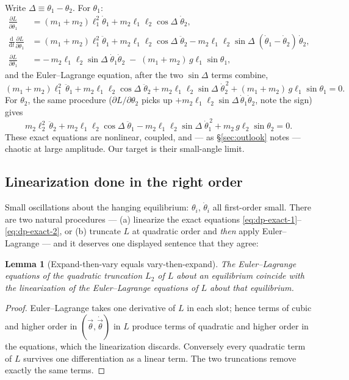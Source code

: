 \documentclass[11pt]{article}
\theoremstyle{plain}
\newtheorem{lemma}[theorem]{Lemma}
\theoremstyle{definition}
\theoremstyle{remark}
\newcommand{\dd}{\mathrm{d}}
\newcommand{\pd}[2]{\frac{\partial #1}{\partial #2}}
\newcommand{\vth}{\vec{\theta}}
\begin{document}
Write $\Delta \equiv \theta_1 - \theta_2$. For $\theta_1$:
\begin{align}
  \pd{L}{\dot\theta_1}
  &= (m_1{+}m_2)\ell_1^2\dot\theta_1
   + m_2\ell_1\ell_2\cos\Delta\;\dot\theta_2, \\
  \frac{\dd}{\dd t}\pd{L}{\dot\theta_1}
  &= (m_1{+}m_2)\ell_1^2\ddot\theta_1
   + m_2\ell_1\ell_2\cos\Delta\;\ddot\theta_2
   - m_2\ell_1\ell_2\sin\Delta\;(\dot\theta_1 - \dot\theta_2)\,\dot\theta_2, \\
  \pd{L}{\theta_1}
  &= -\,m_2\ell_1\ell_2\sin\Delta\;\dot\theta_1\dot\theta_2
   \;-\; (m_1{+}m_2)\,g\ell_1\sin\theta_1 ,
\end{align}
and the Euler--Lagrange equation, after the two $\sin\Delta$ terms
combine,
\begin{equation}
  (m_1{+}m_2)\ell_1^2\,\ddot\theta_1
  + m_2\ell_1\ell_2\cos\Delta\;\ddot\theta_2
  + m_2\ell_1\ell_2\sin\Delta\;\dot\theta_2^{\,2}
  + (m_1{+}m_2)\,g\ell_1\sin\theta_1 = 0 .
  \label{eq:dp-exact-1}
\end{equation}
For $\theta_2$, the same procedure ($\partial L/\partial\theta_2$ picks up
$+m_2\ell_1\ell_2\sin\Delta\,\dot\theta_1\dot\theta_2$, note the sign)
gives
\begin{equation}
  m_2\ell_2^2\,\ddot\theta_2
  + m_2\ell_1\ell_2\cos\Delta\;\ddot\theta_1
  - m_2\ell_1\ell_2\sin\Delta\;\dot\theta_1^{\,2}
  + m_2\,g\ell_2\sin\theta_2 = 0 .
  \label{eq:dp-exact-2}
\end{equation}
These exact equations are nonlinear, coupled, and --- as
\S\ref{sec:outlook} notes --- chaotic at large amplitude. Our target is
their small-angle limit.

\subsection{Linearization done in the right order}
\label{sec:linearization}

Small oscillations about the hanging equilibrium: $\theta_i$,
$\dot\theta_i$ all first-order small. There are two natural procedures ---
(a) linearize the exact equations
\eqref{eq:dp-exact-1}--\eqref{eq:dp-exact-2}, or (b) truncate $L$ at
quadratic order and \emph{then} apply Euler--Lagrange --- and it deserves
one displayed sentence that they agree:

\begin{lemma}[Expand-then-vary equals vary-then-expand]
\label{lem:order-of-operations}
The Euler--Lagrange equations of the quadratic truncation $L_2$ of $L$
about an equilibrium coincide with the linearization of the
Euler--Lagrange equations of $L$ about that equilibrium.
\end{lemma}
\begin{proof}
Euler--Lagrange takes one derivative of $L$ in each slot; hence terms of
cubic and higher order in $(\vth, \dot\vth)$ in $L$ produce terms of
quadratic and higher order in the equations, which the linearization
discards. Conversely every quadratic term of $L$ survives one
differentiation as a linear term. The two truncations remove exactly the
same terms.
\end{proof}
\end{document}
